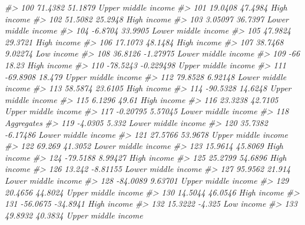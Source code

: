 \documentclass[
  xelatex, ja=standard]{bxjsbook}
\newenvironment{Shaded}{\begin{snugshade}}{\end{snugshade}}
\newcommand{\CommentTok}[1]{\textcolor[rgb]{0.56,0.35,0.01}{\textit{#1}}}
\theoremstyle{definition}
\theoremstyle{definition}
\theoremstyle{definition}
\theoremstyle{definition}
\theoremstyle{remark}
\begin{document}
\begin{Shaded}
\begin{Highlighting}[]
\CommentTok{\#\textgreater{} 100    71.4382    51.1879 Upper middle income}
\CommentTok{\#\textgreater{} 101    19.0408    47.4984         High income}
\CommentTok{\#\textgreater{} 102    51.5082    25.2948         High income}
\CommentTok{\#\textgreater{} 103    3.05097    36.7397 Lower middle income}
\CommentTok{\#\textgreater{} 104    {-}6.8704    33.9905 Lower middle income}
\CommentTok{\#\textgreater{} 105    47.9824    29.3721         High income}
\CommentTok{\#\textgreater{} 106    17.1073    48.1484         High income}
\CommentTok{\#\textgreater{} 107    38.7468    9.02274          Low income}
\CommentTok{\#\textgreater{} 108    36.8126   {-}1.27975 Lower middle income}
\CommentTok{\#\textgreater{} 109        {-}66      18.23         High income}
\CommentTok{\#\textgreater{} 110   {-}78.5243  {-}0.229498 Upper middle income}
\CommentTok{\#\textgreater{} 111   {-}69.8908     18.479 Upper middle income}
\CommentTok{\#\textgreater{} 112    79.8528    6.92148 Lower middle income}
\CommentTok{\#\textgreater{} 113    58.5874    23.6105         High income}
\CommentTok{\#\textgreater{} 114   {-}90.5328    14.6248 Upper middle income}
\CommentTok{\#\textgreater{} 115     6.1296      49.61         High income}
\CommentTok{\#\textgreater{} 116    23.3238    42.7105 Upper middle income}
\CommentTok{\#\textgreater{} 117   {-}0.20795    5.57045 Lower middle income}
\CommentTok{\#\textgreater{} 118                                Aggregates}
\CommentTok{\#\textgreater{} 119    {-}4.0305      5.332 Lower middle income}
\CommentTok{\#\textgreater{} 120    35.7382   {-}6.17486 Lower middle income}
\CommentTok{\#\textgreater{} 121    27.5766    53.9678 Upper middle income}
\CommentTok{\#\textgreater{} 122     69.269    41.3052 Lower middle income}
\CommentTok{\#\textgreater{} 123    15.9614    45.8069         High income}
\CommentTok{\#\textgreater{} 124   {-}79.5188    8.99427         High income}
\CommentTok{\#\textgreater{} 125    25.2799    54.6896         High income}
\CommentTok{\#\textgreater{} 126     13.242   {-}8.81155 Lower middle income}
\CommentTok{\#\textgreater{} 127    95.9562     21.914 Lower middle income}
\CommentTok{\#\textgreater{} 128   {-}84.0089    9.63701 Upper middle income}
\CommentTok{\#\textgreater{} 129    20.4656    44.8024 Upper middle income}
\CommentTok{\#\textgreater{} 130    14.5044    46.0546         High income}
\CommentTok{\#\textgreater{} 131   {-}56.0675   {-}34.8941         High income}
\CommentTok{\#\textgreater{} 132    15.3222     {-}4.325          Low income}
\CommentTok{\#\textgreater{} 133    49.8932    40.3834 Upper middle income}

\end{Highlighting}
\end{Shaded}
\end{document}
